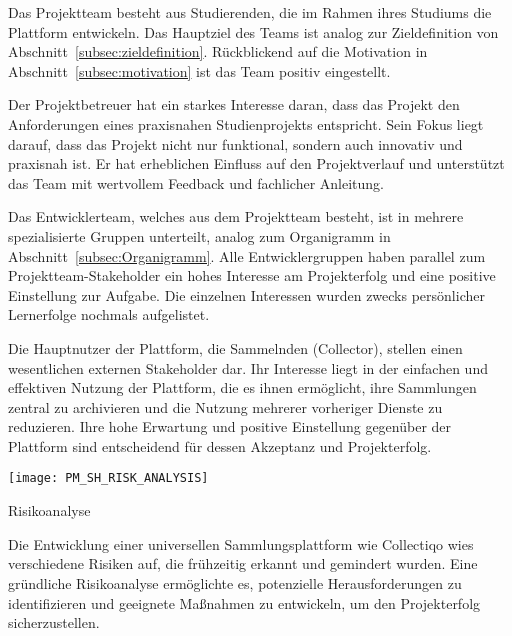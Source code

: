 Das Projektteam besteht aus Studierenden, die im Rahmen ihres Studiums die Plattform entwickeln.
Das Hauptziel des Teams ist analog zur Zieldefinition von Abschnitt~\ref{subsec:zieldefinition}.
Rückblickend auf die Motivation in Abschnitt~\ref{subsec:motivation} ist das Team positiv eingestellt. \par

Der Projektbetreuer hat ein starkes Interesse daran, dass das Projekt den Anforderungen eines praxisnahen Studienprojekts entspricht.
Sein Fokus liegt darauf, dass das Projekt nicht nur funktional, sondern auch innovativ und praxisnah ist.
Er hat erheblichen Einfluss auf den Projektverlauf und unterstützt das Team mit wertvollem Feedback und fachlicher Anleitung. \par

Das Entwicklerteam, welches aus dem Projektteam besteht, ist in mehrere spezialisierte Gruppen unterteilt, analog zum Organigramm in Abschnitt~\ref{subsec:Organigramm}.
Alle Entwicklergruppen haben parallel zum Projektteam-Stakeholder ein hohes Interesse am Projekterfolg und eine positive Einstellung zur Aufgabe.
Die einzelnen Interessen wurden zwecks persönlicher Lernerfolge nochmals aufgelistet. \par

Die Hauptnutzer der Plattform, die Sammelnden (Collector), stellen einen wesentlichen externen Stakeholder dar.
Ihr Interesse liegt in der einfachen und effektiven Nutzung der Plattform, die es ihnen ermöglicht, ihre Sammlungen zentral zu archivieren und die Nutzung mehrerer vorheriger Dienste zu reduzieren.
Ihre hohe Erwartung und positive Einstellung gegenüber der Plattform sind entscheidend für dessen Akzeptanz und Projekterfolg. \par


\begin{table}[h!]
    \centering
    \texttt{[image: PM\_SH\_RISK\_ANALYSIS]}
    \caption{Risikoanalyse}\label{tab:risikoanalyse}
\end{table}

Die Entwicklung einer universellen Sammlungsplattform wie Collectiqo wies verschiedene Risiken auf, die frühzeitig erkannt und gemindert wurden.
Eine gründliche Risikoanalyse ermöglichte es, potenzielle Herausforderungen zu identifizieren und geeignete Maßnahmen zu entwickeln, um den Projekterfolg sicherzustellen.

